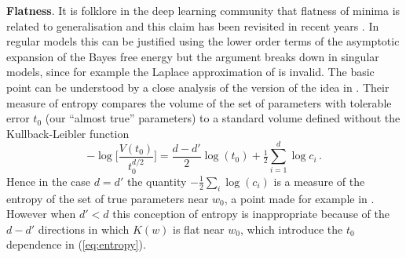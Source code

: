 \documentclass{article} %
\begin{document}
\textbf{Flatness}. It is folklore in the deep learning community that flatness of minima is related to generalisation \citep{hinton_keeping_1993, hochreiter1997flat} and this claim has been revisited in recent years \citep{chaudhari2019entropy, smith2017bayesian, jastrzkebski2017three, Zhang:2018MolPh.116.3214Z}. In regular models this can be justified using the lower order terms of the asymptotic expansion of the Bayes free energy \citep[\S 3.1]{Balasubramanian:1996cond.mat..1030B} but the argument breaks down in singular models, since for example the Laplace approximation of \cite{Zhang:2018MolPh.116.3214Z} is invalid. The basic point can be understood by a close analysis of the version of the idea in \citep{hochreiter1997flat}. Their measure of entropy compares the volume of the set of parameters with tolerable error $t_0$ (our ``almost true'' parameters) to a standard volume defined without the Kullback-Leibler function
\begin{equation}\label{eq:entropy}
- \log\Big[\frac{V(t_0)}{t_0^{d/2}}\Big] = \frac{d-d'}{2} \log(t_0) + \tfrac{1}{2} \sum_{i=1}^{d} \log c_i\,.
\end{equation}
Hence in the case $d = d'$ the quantity $-\tfrac{1}{2} \sum_i \log(c_i)$ is a measure of the entropy of the set of true parameters near $w_0$, a point made for example in \cite{Zhang:2018MolPh.116.3214Z}. However when $d' < d$ this conception of entropy is inappropriate because of the $d - d'$ directions in which $K(w)$ is flat near $w_0$, which introduce the $t_0$ dependence in (\ref{eq:entropy}).

\end{document}
